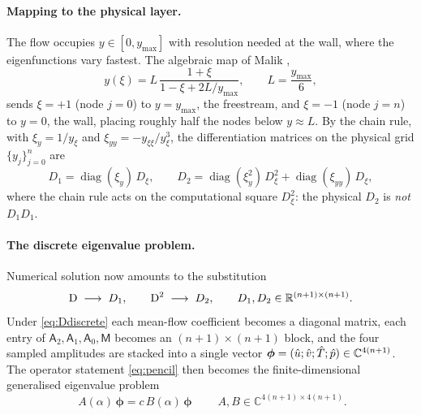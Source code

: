 \documentclass[11pt]{article}
\begin{document}
\paragraph{Mapping to the physical layer.} The flow occupies $y\in[0,y_{\max}]$ with resolution
needed at the wall, where the eigenfunctions vary fastest. The algebraic map of Malik
\cite{malik1990},
\begin{equation}\label{eq:chebmap}
  y(\xi)=L\,\frac{1+\xi}{1-\xi+2L/y_{\max}},\qquad L=\frac{y_{\max}}{6},
\end{equation}
sends $\xi=+1$ (node $j{=}0$) to $y=y_{\max}$, the freestream, and $\xi=-1$ (node $j{=}n$) to
$y=0$, the wall, placing roughly half the nodes below $y\approx L$. By the
chain rule, with $\xi_y=1/y_\xi$ and $\xi_{yy}=-y_{\xi\xi}/y_\xi^3$, the differentiation matrices
on the physical grid $\{y_j\}_{j=0}^{n}$ are
\begin{equation}\label{eq:Dmats}
  D_1=\operatorname{diag}(\xi_y)\,D_\xi,\qquad
  D_2=\operatorname{diag}(\xi_y^2)\,D_\xi^2+\operatorname{diag}(\xi_{yy})\,D_\xi ,
\end{equation}
where the chain rule acts on the computational square $D_\xi^2$: the physical $D_2$ is \emph{not}
$D_1D_1$.

\paragraph{The discrete eigenvalue problem.} Numerical solution now amounts to the substitution
\begin{equation}\label{eq:Ddiscrete}
  \mathrm{D}\;\longrightarrow\;D_1,\qquad \mathrm{D}^2\;\longrightarrow\;D_2,\qquad
  D_1,D_2\in\mathbb R^{(n+1)\times(n+1)}.
\end{equation}
Under \eqref{eq:Ddiscrete} each mean-flow coefficient becomes a diagonal
matrix, each entry of $\mathsf A_2,\mathsf A_1,\mathsf A_0,\mathsf M$ becomes an
$(n{+}1)\times(n{+}1)$ block, and the four sampled amplitudes are stacked into a single vector
$\boldsymbol\phi=(\hat{u};\hat{v};\hat{T};\hat{p})\in\mathbb C^{4(n+1)}$. The operator statement
\eqref{eq:pencil} then becomes the finite-dimensional generalised eigenvalue problem
\begin{equation}\label{eq:gevp}
  \boxed{\;A(\alpha)\,\boldsymbol\phi=c\,B(\alpha)\,\boldsymbol\phi\;}\qquad
  A,B\in\mathbb C^{4(n+1)\times4(n+1)}.
\end{equation}
\end{document}
